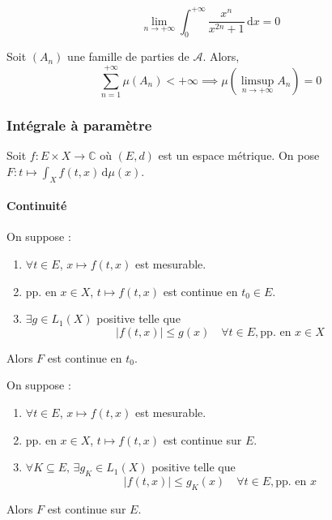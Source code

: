 	
	\begin{example}
		\[ \lim_{n \rightarrow +\infty} \int_{0}^{+\infty} \frac{x^n}{x^{2n} + 1} \, \mathrm{d}x = 0 \]
	\end{example}
	
	
	\begin{application}
		Soit $(A_n)$ une famille de parties de $\mathcal{A}$. Alors,
		\[ \sum_{n=1}^{+\infty} \mu(A_n) < +\infty \implies \mu \left( \limsup_{n \rightarrow +\infty} A_n \right) = 0 \]
	\end{application}
	
	\subsubsection{Intégrale à paramètre}
	
	
	Soit $f : E \times X \rightarrow \mathbb{C}$ où $(E, d)$ est un espace métrique. On pose $F : t \mapsto \int_X f(t, x) \, \mathrm{d}\mu(x)$.
	
	\paragraph{Continuité}
	
	\begin{theorem}
		On suppose :
		\begin{enumerate}[label=(\roman*)]
			\item $\forall t \in E$, $x \mapsto f(t,x)$ est mesurable.
			\item pp. en $x \in X$, $t \mapsto f(t,x)$ est continue en $t_0 \in E$.
			\item $\exists g \in L_1(X)$ positive telle que
			\[ |f(t,x)| \leq g(x) \quad \forall t \in E, \text{pp. en } x \in X \]
		\end{enumerate}
		Alors $F$ est continue en $t_0$.
	\end{theorem}
	
	\begin{corollary}
		On suppose :
		\begin{enumerate}[label=(\roman*)]
			\item $\forall t \in E$, $x \mapsto f(t,x)$ est mesurable.
			\item pp. en $x \in X$, $t \mapsto f(t,x)$ est continue sur $E$.
			\item $\forall K \subseteq E, \, \exists g_K \in L_1(X)$ positive telle que
			\[ |f(t,x)| \leq g_K(x) \quad \forall t \in E, \text{pp. en } x \]
		\end{enumerate}
		Alors $F$ est continue sur $E$.
	\end{corollary}
	
